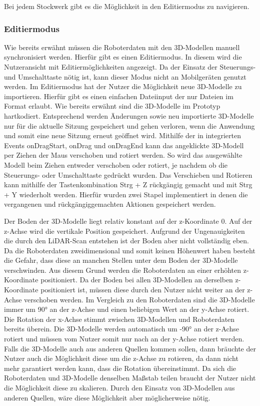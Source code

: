 Bei jedem Stockwerk gibt es die Möglichkeit in den Editiermodus zu navigieren.

\subsubsection{Editiermodus}
Wie bereits erwähnt müssen die Roboterdaten mit den 3D-Modellen manuell synchronisiert werden. Hierfür gibt es einen Editiermodus. In diesem wird die Nutzeransicht mit Editiermöglichkeiten angezeigt. Da der Einsatz der Steuerungs- und Umschalttaste nötig ist, kann dieser Modus nicht an Mobilgeräten genutzt werden. Im Editiermodus hat der Nutzer die Möglichkeit neue 3D-Modelle zu importieren. Hierfür gibt es einen einfachen Dateiinput der nur Dateien im \glb{} Format erlaubt. Wie bereits erwähnt sind die 3D-Modelle im Prototyp hartkodiert. Entsprechend werden Änderungen sowie neu importierte 3D-Modelle nur für die aktuelle Sitzung gespeichert und gehen verloren, wenn die Anwendung und somit eine neue Sitzung erneut geöffnet wird. Mithilfe der in \deckgl{} integrierten Events onDragStart, onDrag und onDragEnd kann das angeklickte 3D-Modell per Ziehen der Maus verschoben und rotiert werden.
So wird das ausgewählte Modell beim Ziehen entweder verschoben oder rotiert, je nachdem ob die Steuerungs- oder Umschalttaste gedrückt wurden. Das Verschieben und Rotieren kann mithilfe der Tastenkombination Strg + Z rückgängig gemacht und mit Strg + Y wiederholt werden. Hierfür wurden zwei Stapel implementiert in denen die vergangenen und rückgängiggemachten Aktionen gespeichert werden.

Der Boden der 3D-Modelle liegt relativ konstant auf der z-Koordinate 0. Auf der z-Achse wird die vertikale Position gespeichert. Aufgrund der Ungenauigkeiten die durch den \ac{LiDAR}-Scan entstehen ist der Boden aber nicht vollständig eben. Da die Roboterdaten zweidimensional und somit keinen Höhenwert haben besteht die Gefahr, dass diese an manchen Stellen unter dem Boden der 3D-Modelle verschwinden. Aus diesem Grund werden die Roboterdaten an einer erhöhten z-Koordinate positioniert. Da der Boden bei allen 3D-Modellen an derselben z-Koordinate positioniert ist, müssen diese durch den Nutzer nicht weiter an der z-Achse verschoben werden. Im Vergleich zu den Roboterdaten sind die 3D-Modelle immer um 90° an der z-Achse und einen beliebigen Wert an der y-Achse rotiert. Die Rotation der x-Achse stimmt zwischen 3D-Modellen und Roboterdaten bereits überein. Die 3D-Modelle werden automatisch um -90° an der z-Achse rotiert und müssen vom Nutzer somit nur nach an der y-Achse rotiert werden. Falls die 3D-Modelle auch aus anderen Quellen kommen sollen, dann bräuchte der Nutzer auch die Möglichkeit diese um die z-Achse zu rotieren, da dann nicht mehr garantiert werden kann, dass die Rotation übereinstimmt. Da sich die Roboterdaten und 3D-Modelle denselben Maßstab teilen braucht der Nutzer nicht die Möglichkeit diese zu skalieren. Durch den Einsatz von 3D-Modellen aus anderen Quellen, wäre diese Möglichkeit aber möglicherweise nötig.

